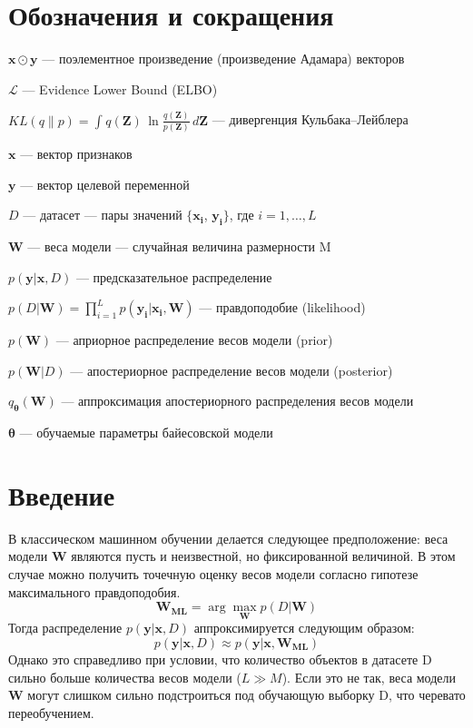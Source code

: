 \documentclass{article}
\newcommand{\argmax}{\arg\!\max}
\begin{document}
    \section{Обозначения и сокращения}
    $\pmb{x} \odot \pmb{y}$ --- поэлементное произведение (произведение Адамара) векторов \par
    $\mathcal{L}$ --- Evidence Lower Bound (ELBO) \par
    $
        KL(q \parallel p)
        =
        \int_{}{
            q(\pmb{Z})
            \,
            \ln{
                \frac
                    {q(\pmb{Z})}
                    {p(\pmb{Z})}
            }
            \,
            d\pmb{Z}
        }
    $ --- дивергенция Кульбака--Лейблера \par
    $\pmb{x}$ --- вектор признаков \par
    $\pmb{y}$ --- вектор целевой переменной \par
    $D$ --- датасет --- пары значений $\{\pmb{x_i}$, $\pmb{y_i}\}$, где $i = 1, \dots, L$ \par
    $\pmb{W}$ --- веса модели --- случайная величина размерности M \par
    $p(\pmb{y} | \pmb{x}, D)$ --- предсказательное распределение \par
    $
        p(D | \pmb{W})
        =
        \prod_{i=1}^{L}{
            p(\pmb{y_i} | \pmb{x_i}, \pmb{W})
        }
    $ — правдоподобие (likelihood) \par
    $p(\pmb{W})$ --- априорное распределение весов модели (prior) \par
    $p(\pmb{W}| D)$ --- апостериорное распределение весов модели (posterior) \par
    $q_{\pmb{\theta}}(\pmb{W})$ --- аппроксимация апостериорного распределения весов модели \par
    $\pmb{\theta}$ --- обучаемые параметры байесовской модели \par

    \section{Введение}

    В классическом машинном обучении делается следующее предположение:
    веса модели $\pmb{W}$ являются пусть и неизвестной, но фиксированной величиной.
    В этом случае можно получить точечную оценку весов модели согласно гипотезе максимального правдоподобия.
    \[
        \pmb{W_{ML}} = \argmax_{\pmb{W}} p(D | \pmb{W})
    \]
    Тогда распределение $p(\pmb{y} | \pmb{x}, D)$ аппроксимируется следующим образом:
    \[
        p(\pmb{y} | \pmb{x}, D) \approx p(\pmb{y} | \pmb{x}, \pmb{W_{ML}})
    \]
    Однако это справедливо при условии, что количество объектов в датасете D
    сильно больше количества весов модели ($L \gg M$).
    Если это не так, веса модели $\pmb{W}$ могут слишком сильно подстроиться
    под обучающую выборку D, что черевато переобучением.
\end{document}
